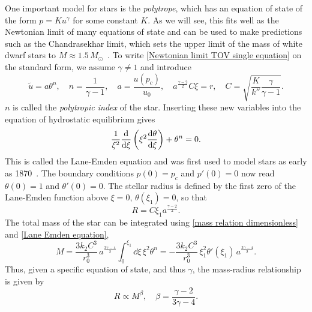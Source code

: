 One important model for stars is the \emph{polytrope}, which has an equation of state of the form $p = K u^\gamma$ for some constant $K$.
As we will see, this fits well as the Newtonian limit of many equations of state and can be used to make predictions such as the Chandrasekhar limit, which sets the upper limit of the mass of white dwarf stars to $M \approx 1.5 \, M_\odot$~\autocite{chandrasekharHighlyCollapsedConfigurations1935,glendenningCompactStarsNuclear2012}.
To write \autoref{Newtonian limit TOV single equation} on the standard form, we assume $\gamma \neq 1$ and introduce
%
\begin{equation}
    \tilde u = a \theta^{n}, \quad 
    n = \frac{1}{\gamma - 1}, \quad 
    a = \frac{u(p_c)}{u_0}, 
    \quad a^{\frac{\gamma - 2}{2}}C \xi = r, \quad 
    C =\sqrt{ \frac{K}{k''} \frac{\gamma}{\gamma - 1}}.
\end{equation}
%
$n$ is called the \emph{polytropic index} of the star.
Inserting these new variables into the equation of hydrostatic equilibrium gives
%
\begin{equation}
    \label{Lane Emden equation}
    \frac{1}{\xi^2} \odv{}{\xi} \left(\xi^2 \odv{\theta}{\xi} \right) + \theta^n = 0.
\end{equation}
%
This is called the Lane-Emden equation and was first used to model stars as early as 1870~\autocite{laneTheoreticalTemperatureSun1870}.
The boundary conditions $p(0) = p_c$ and $p'(0) = 0$ now read $\theta(0) = 1$ and $\theta'(0) = 0$.
The stellar radius is defined by the first zero of the Lane-Emden function above $\xi = 0$, $\theta(\xi_1) = 0$, so that
%
\begin{equation}
    \label{Radius polytrope}
    R = C \xi_1  a^{\frac{\gamma-2}{2}}. 
\end{equation}
%
The total mass of the star can be integrated using \autoref{mass relation dimensionless} and \autoref{Lane Emden equation},
%
\begin{equation}
    M = \frac{3 k_2 C^3 }{r_0^3}\, a^{\frac{3\gamma-4}{2}}  \int^{\xi_1}_0 \dd \xi \, \xi^2 \theta^n = - \frac{3 k_2 C^3 }{r_0^3}\, \xi_1^2 \theta'(\xi_1)\, a^{\frac{3\gamma-4}{2}}.
\end{equation}
%
Thus, given a specific equation of state, and thus $\gamma$, the mass-radius relationship is given by
%
\begin{equation}
    \label{Polytrope mass-radius relationship}
    R \propto M^\beta, \quad \beta = {\frac{\gamma - 2}{3 \gamma - 4}}.
\end{equation}



